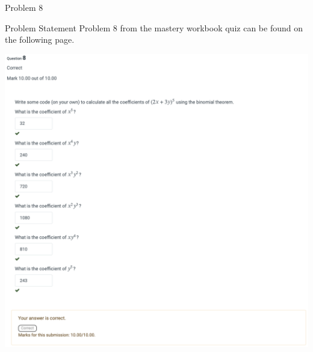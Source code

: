\begin{problem}{Problem 8}
    \begin{statement}{Problem Statement}
        Problem 8 from the mastery workbook quiz can be found on the following page.
    \end{statement}
    \begin{Highlight}[Solution]
        \begin{center}
            \includegraphics[width = 1.0\textwidth]{Images/Problem 8.png}
        \end{center}
    \end{Highlight}
\end{problem}

